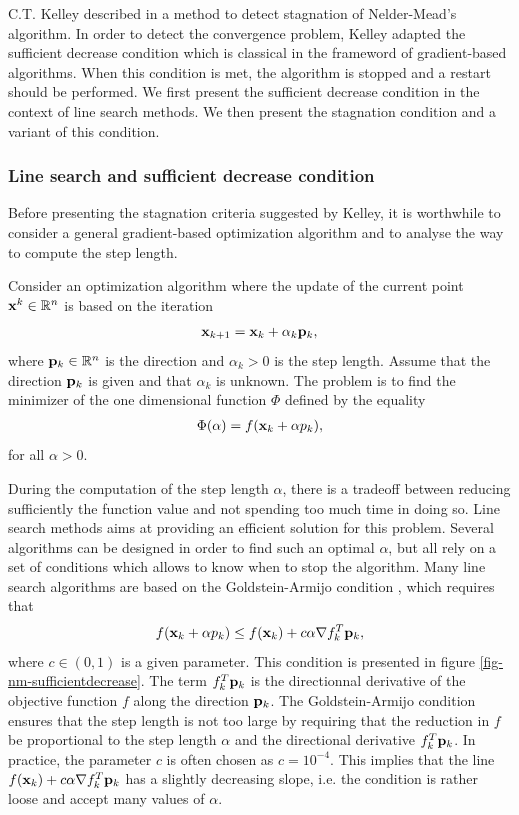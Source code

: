 C.T. Kelley described in \cite{589283} a method to detect stagnation
of Nelder-Mead's algorithm. 
In order to detect the convergence problem, Kelley adapted the sufficient decrease 
condition which is classical in the frameword of gradient-based algorithms.
When this condition is met, the algorithm is stopped and a restart should be performed.
We first present the sufficient decrease condition in the context of 
line search methods. We then present the stagnation condition and a variant of this 
condition.

\subsubsection{Line search and sufficient decrease condition}

Before presenting the stagnation criteria suggested by Kelley, it 
is worthwhile to consider a general gradient-based optimization
algorithm and to analyse the way to compute the step length.

Consider an optimization algorithm where the update of the current point $\mathbf{x}^k\in\mathbb{R}^n$
is based on the iteration 
\begin{eqnarray}
\mathbf{x}_{k+1} = \mathbf{x}_k + \alpha_k \mathbf{p}_k,
\end{eqnarray}
where $\mathbf{p}_k\in\mathbb{R}^n$ is the direction and $\alpha_k>0$ is the step 
length. Assume that the direction $\mathbf{p}_k$ is given and that $\alpha_k$ is 
unknown. The problem is to find the minimizer of the one dimensional function 
$\Phi$ defined by the equality 
\begin{eqnarray}
\Phi(\alpha) = f ( \mathbf{x}_k + \alpha p_k),
\end{eqnarray}
for all $\alpha>0$.

During the computation of the step length $\alpha$, there is a tradeoff 
between reducing sufficiently the function value and not spending 
too much time in doing so. Line search methods aims at providing an efficient 
solution for this problem. Several algorithms can be designed in order 
to find such an optimal $\alpha$, but all rely on a set of conditions 
which allows to know when to stop the algorithm. Many line search 
algorithms are based on the Goldstein-Armijo condition \cite{numericaloptimization,Gill81MurrayWright}, 
which requires that 
\begin{eqnarray}
f ( \mathbf{x}_k + \alpha p_k) \leq f(\mathbf{x}_k) + c \alpha \nabla f_k^T \mathbf{p}_k,
\end{eqnarray}
where $c\in(0,1)$ is a given parameter. This condition is presented in
figure \ref{fig-nm-sufficientdecrease}. The term $f_k^T \mathbf{p}_k$ is the 
directionnal derivative of the objective function $f$ along the direction
$\mathbf{p}_k$. The Goldstein-Armijo condition ensures that the step length is not 
too large by requiring that the reduction in $f$ be proportional 
to the step length $\alpha$ and the directional derivative $f_k^T \mathbf{p}_k$.
In practice, the parameter $c$ is often chosen as $c=10^{-4}$. 
This implies that the line $f(\mathbf{x}_k) + c \alpha \nabla f_k^T \mathbf{p}_k$ has 
a slightly decreasing slope, i.e. the condition is rather loose and 
accept many values of $\alpha$.

